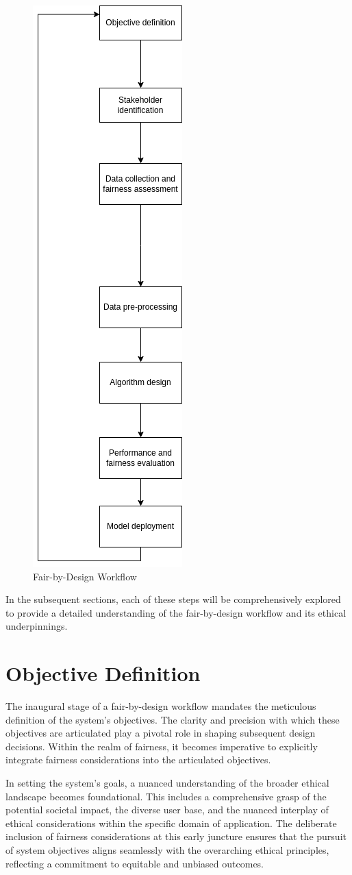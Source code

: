 \documentclass[12pt,a4paper,openright,twoside]{book}
\begin{document}
\begin{figure}[hp]
    \centering
    \includegraphics[width=.5\textwidth,height=1\textwidth]{final.png}
    \caption{Fair-by-Design Workflow}
\end{figure}

In the subsequent sections, each of these steps will be comprehensively explored to provide a detailed understanding of the fair-by-design workflow and its ethical underpinnings.

\section{Objective Definition}
\label{section:objective-definition}

The inaugural stage of a fair-by-design workflow mandates the meticulous definition of the system's objectives. The clarity and precision with which these objectives are articulated play a pivotal role in shaping subsequent design decisions. Within the realm of fairness, it becomes imperative to explicitly integrate fairness considerations into the articulated objectives.

In setting the system's goals, a nuanced understanding of the broader ethical landscape becomes foundational. This includes a comprehensive grasp of the potential societal impact, the diverse user base, and the nuanced interplay of ethical considerations within the specific domain of application. The deliberate inclusion of fairness considerations at this early juncture ensures that the pursuit of system objectives aligns seamlessly with the overarching ethical principles, reflecting a commitment to equitable and unbiased outcomes.
\end{document}
